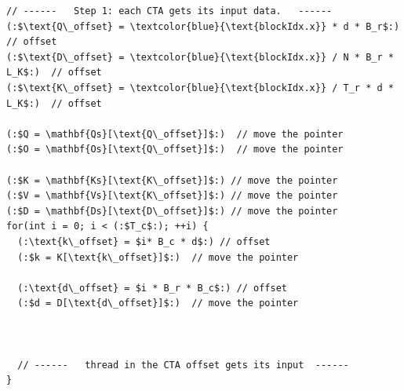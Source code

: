 
\begin{figure}[htbp]
  \centering
  \vspace{-1mm}
  \vspace{-1mm}
\end{figure}
\vspace{-0.1cm}

\begin{lstlisting}[language=code_example2, caption={}]
// ------   Step 1: each CTA gets its input data.   ------
(:$\text{Q\_offset} = \textcolor{blue}{\text{blockIdx.x}} * d * B_r$:)  // offset
(:$\text{D\_offset} = \textcolor{blue}{\text{blockIdx.x}} / N * B_r * L_K$:)  // offset
(:$\text{K\_offset} = \textcolor{blue}{\text{blockIdx.x}} / T_r * d * L_K$:)  // offset

(:$Q = \mathbf{Qs}[\text{Q\_offset}]$:)  // move the pointer
(:$O = \mathbf{Os}[\text{Q\_offset}]$:)  // move the pointer

(:$K = \mathbf{Ks}[\text{K\_offset}]$:) // move the pointer
(:$V = \mathbf{Vs}[\text{K\_offset}]$:) // move the pointer
(:$D = \mathbf{Ds}[\text{D\_offset}]$:) // move the pointer
for(int i = 0; i < (:$T_c$:); ++i) {
  (:\text{k\_offset} = $i* B_c * d$:) // offset
  (:$k = K[\text{k\_offset}]$:)  // move the pointer

  (:\text{d\_offset} = $i * B_r * B_c$:) // offset
  (:$d = D[\text{d\_offset}]$:)  // move the pointer



  // ------   thread in the CTA offset gets its input  ------
}
\end{lstlisting}

